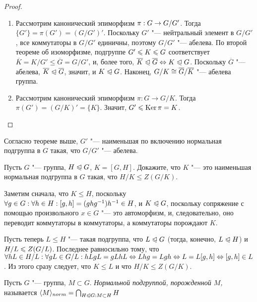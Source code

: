\begin{proof}~
	\begin{enumerate}
		\item Рассмотрим канонический эпиморфизм $\pi: G \hm\to G / G'$. Тогда $\{G'\} = \pi(G') = (G / G')'$. Поскольку $G'$ "--- нейтральный элемент в $G / G'$, все коммутаторы в $G / G'$ единичны, поэтому $G / G'$ "--- абелева. По второй теореме об изоморфизме, подгруппе $G' \hm\le K \le G$ соответствует $\overline{K} = K / G' \le \overline{G} = G / G'$, и, более того, $\overline{K} \trianglelefteqslant \overline{G} \Leftrightarrow K \trianglelefteqslant G$. Поскольку $\overline{G}$ "--- абелева, $\overline{K} \trianglelefteqslant \overline{G}$, значит, и $K \trianglelefteqslant G$. Наконец, $G / K \hm\cong \overline{G} / \overline{K}$ "--- абелева группа.
		
		\item Рассмотрим канонический эпиморфизм $\pi: G \to G / K$. Тогда $\pi(G') = (G / K)' = \{K\}$. Значит, $G' \leqslant \operatorname{Ker}\pi = K$.
	\end{enumerate}
\end{proof}

\begin{note}
	Согласно теореме выше, $G'$ "--- наименьшая по включению нормальная подгруппа в $G$ такая, что $G / G'$ "--- абелева.
\end{note}

\begin{exercise}
	Пусть $G$ "--- группа, $H \trianglelefteqslant G$, $K = [G, H]$. Докажите, что $K$ "--- это наименьшая нормальная подгруппа в $G$ такая, что $H / K \le Z (G / K)$.
\end{exercise}

\begin{solution}
	Заметим сначала, что $K \le H$, поскольку $\forall g \in G: \forall h \hm\in H: [g, h] = (ghg^{-1})h^{-1} \hm\in H$, и $K \trianglelefteqslant G$, поскольку сопряжение с помощью произвольного $x \in G$ "--- это автоморфизм, и, следовательно, оно переводит коммутаторы в коммутаторы, а коммутаторы порождают $K$.
	
	Пусть теперь $L \le H$ "--- такая подгруппа, что $L \trianglelefteqslant G$ (тогда, конечно, $L \trianglelefteqslant H$) и $H / L \hm\le Z(G / L)$. Последнее равносильно тому, что $\forall hL \in H / L: \forall gL \in G / L: hLgL = gLhL \hm\lra Lhg = Lgh \hm\lra L = L[g, h] \lra [g, h] \in L$. Из этого сразу следует, что $K \le L$ и что $H / K \le Z(G / K)$.
\end{solution}

\begin{definition}
	Пусть $G$ "--- группа, $M \subset G$. \textit{Нормальной подгруппой, порожденной $M$,} называется $\langle M\rangle_{norm} = \bigcap_{H \trianglelefteqslant G: M \subset H} H$
\end{definition}

